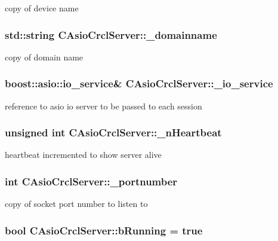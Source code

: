 copy of device name \hypertarget{classCAsioCrclServer_abd6cbb0022e0c2280995faf988ab0425}{
\subsubsection[{\-\_\-domainname}]{\setlength{\rightskip}{0pt plus 5cm}std\-::string C\-Asio\-Crcl\-Server\-::\-\_\-domainname}}\label{classCAsioCrclServer_abd6cbb0022e0c2280995faf988ab0425}
copy of domain name \hypertarget{classCAsioCrclServer_a856ce7cbc3dea93ba07b7b5583de953a}{
\subsubsection[{\-\_\-io\-\_\-service}]{\setlength{\rightskip}{0pt plus 5cm}boost\-::asio\-::io\-\_\-service\& C\-Asio\-Crcl\-Server\-::\-\_\-io\-\_\-service}}\label{classCAsioCrclServer_a856ce7cbc3dea93ba07b7b5583de953a}
reference to asio io server to be passed to each session \hypertarget{classCAsioCrclServer_ac570936983b073ee12604164b0e08995}{
\subsubsection[{\-\_\-n\-Heartbeat}]{\setlength{\rightskip}{0pt plus 5cm}unsigned int C\-Asio\-Crcl\-Server\-::\-\_\-n\-Heartbeat}}\label{classCAsioCrclServer_ac570936983b073ee12604164b0e08995}
heartbeat incremented to show server alive \hypertarget{classCAsioCrclServer_ab10b3071051c4889372d0eb30bacc604}{
\subsubsection[{\-\_\-portnumber}]{\setlength{\rightskip}{0pt plus 5cm}int C\-Asio\-Crcl\-Server\-::\-\_\-portnumber}}\label{classCAsioCrclServer_ab10b3071051c4889372d0eb30bacc604}
copy of socket port number to listen to \hypertarget{classCAsioCrclServer_a2760cb716a58bf1bb3de970e806b7e94}{
\subsubsection[{b\-Running}]{\setlength{\rightskip}{0pt plus 5cm}bool C\-Asio\-Crcl\-Server\-::b\-Running = true\hspace{0.3cm}{\ttfamily [static]}}}\label{classCAsioCrclServer_a2760cb716a58bf1bb3de970e806b7e94}
